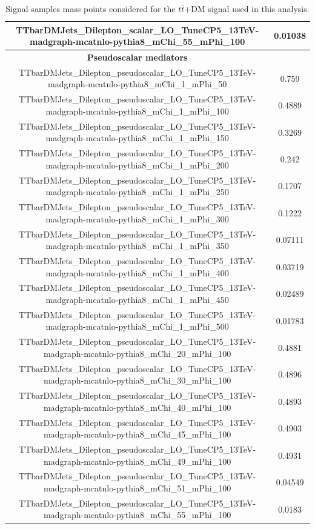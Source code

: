 \documentclass[a4paper, 10pt, openright]{report}
\begin{document}
\begin{appendices}
\begin{table}
\begin{center}
{\begin{tabular}{ c|c }
 TTbarDMJets\_Dilepton\_scalar\_LO\_TuneCP5\_13TeV-madgraph-mcatnlo-pythia8\_mChi\_55\_mPhi\_100 & 0.01038 \\
 \hline
\textbf{Pseudoscalar mediators} & \\
 TTbarDMJets\_Dilepton\_pseudoscalar\_LO\_TuneCP5\_13TeV-madgraph-mcatnlo-pythia8\_mChi\_1\_mPhi\_50 & 0.759 \\
 TTbarDMJets\_Dilepton\_pseudoscalar\_LO\_TuneCP5\_13TeV-madgraph-mcatnlo-pythia8\_mChi\_1\_mPhi\_100 & 0.4889 \\
 TTbarDMJets\_Dilepton\_pseudoscalar\_LO\_TuneCP5\_13TeV-madgraph-mcatnlo-pythia8\_mChi\_1\_mPhi\_150 & 0.3269 \\
 TTbarDMJets\_Dilepton\_pseudoscalar\_LO\_TuneCP5\_13TeV-madgraph-mcatnlo-pythia8\_mChi\_1\_mPhi\_200 & 0.242 \\
 TTbarDMJets\_Dilepton\_pseudoscalar\_LO\_TuneCP5\_13TeV-madgraph-mcatnlo-pythia8\_mChi\_1\_mPhi\_250 & 0.1707 \\
 TTbarDMJets\_Dilepton\_pseudoscalar\_LO\_TuneCP5\_13TeV-madgraph-mcatnlo-pythia8\_mChi\_1\_mPhi\_300 & 0.1222 \\
 TTbarDMJets\_Dilepton\_pseudoscalar\_LO\_TuneCP5\_13TeV-madgraph-mcatnlo-pythia8\_mChi\_1\_mPhi\_350 & 0.07111 \\
 TTbarDMJets\_Dilepton\_pseudoscalar\_LO\_TuneCP5\_13TeV-madgraph-mcatnlo-pythia8\_mChi\_1\_mPhi\_400 & 0.03719 \\
 TTbarDMJets\_Dilepton\_pseudoscalar\_LO\_TuneCP5\_13TeV-madgraph-mcatnlo-pythia8\_mChi\_1\_mPhi\_450 & 0.02489 \\
 TTbarDMJets\_Dilepton\_pseudoscalar\_LO\_TuneCP5\_13TeV-madgraph-mcatnlo-pythia8\_mChi\_1\_mPhi\_500 & 0.01783 \\
 TTbarDMJets\_Dilepton\_pseudoscalar\_LO\_TuneCP5\_13TeV-madgraph-mcatnlo-pythia8\_mChi\_20\_mPhi\_100 & 0.4881 \\
 TTbarDMJets\_Dilepton\_pseudoscalar\_LO\_TuneCP5\_13TeV-madgraph-mcatnlo-pythia8\_mChi\_30\_mPhi\_100 & 0.4896 \\
 TTbarDMJets\_Dilepton\_pseudoscalar\_LO\_TuneCP5\_13TeV-madgraph-mcatnlo-pythia8\_mChi\_40\_mPhi\_100 & 0.4893 \\
 TTbarDMJets\_Dilepton\_pseudoscalar\_LO\_TuneCP5\_13TeV-madgraph-mcatnlo-pythia8\_mChi\_45\_mPhi\_100 & 0.4903 \\
 TTbarDMJets\_Dilepton\_pseudoscalar\_LO\_TuneCP5\_13TeV-madgraph-mcatnlo-pythia8\_mChi\_49\_mPhi\_100 & 0.4931 \\
 TTbarDMJets\_Dilepton\_pseudoscalar\_LO\_TuneCP5\_13TeV-madgraph-mcatnlo-pythia8\_mChi\_51\_mPhi\_100 & 0.04549 \\
 TTbarDMJets\_Dilepton\_pseudoscalar\_LO\_TuneCP5\_13TeV-madgraph-mcatnlo-pythia8\_mChi\_55\_mPhi\_100 & 0.0183 \\
 \hline
\end{tabular}
}
\caption{Signal samples mass points considered for the $t \bar t$+DM signal used in this analysis.}
\label{table:ttDMsignals}
\end{center}
\end{table}


\end{appendices}
\end{document}
